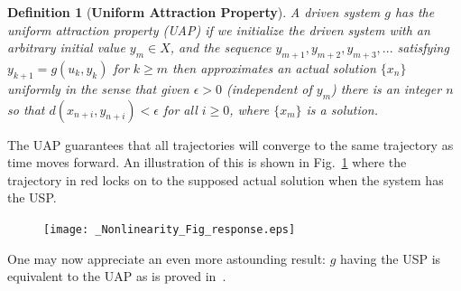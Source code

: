\documentclass[a4paper,12pt,twoside]{report}
\newtheorem{Definition}{Definition}[]
\newtheorem{Theorem}{Theorem}[]
\begin{document}
\begin{Definition}
  [\bf Uniform Attraction Property]\label{Dfn_UAP}\rm
  A driven system $g$ has the uniform attraction property (UAP) if we initialize the driven system
with an arbitrary initial value $y_m \in X$, and the sequence $y_{m+1}, y_{m+2}, y_{m+3},...$ satisfying $y_{k+1}= g(u_k,y_k)$ for $k \geq m$ then approximates an actual solution $\{x_n\}$ uniformly in the sense that given $\epsilon>0$ (independent of $y_m$) there is an integer $n$ so that $d(x_{n+i}, y_{n+i})<\epsilon$ for all $i\ge 0$, where $\{x_m\}$ is a solution.
\end{Definition}

The UAP guarantees that all trajectories will converge to the same trajectory as time moves forward. An illustration of this is shown in Fig.~\ref{fig:memloss_conttime} where the trajectory in red locks on to the supposed actual solution when the system has the USP.

\begin{figure}[ht]
  \texttt{[image: \_Nonlinearity\_Fig\_response.eps]}
  \centering
{}
\label{fig:memloss_conttime} 
\end{figure} 

One may now appreciate an even more astounding result: $g$ having the USP is equivalent to the UAP as is proved in~\cite{Manju_Nonlinearity}.



\end{document}
